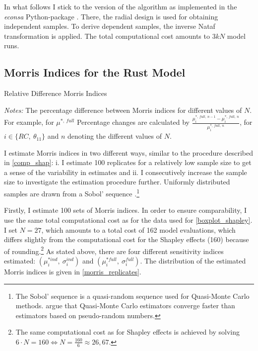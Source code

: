In what follows I stick to the version of the algorithm as implemented in the \textit{econsa} Python-package \citep{OSE21}. There, the radial design is used for obtaining independent samples. To derive dependent samples, the inverse Nataf transformation is applied. The total computational cost amounts to $3kN$ model runs.

\subsection{Morris Indices for the Rust Model} \label{morris_rust_model}

\begin{table}[t]
    \caption{Relative Difference Morris Indices}
    \label{rel_diff_morris}
    \centering

    \begin{threeparttable}
        \begin{centering}
            
            \begin{tablenotes}
                \small
                \item \textit{Notes:} The percentage difference between Morris indices for different values of $N$. For example, for $\mu^{\ast,\ full}$ Percentage changes are calculated by $\frac{\mu^{\ast,\ full,\ n-1}_i - \mu^{\ast,\ full,\ n}_i}{\mu^{\ast,\ full,\ n}_i}$, for $i \in \{RC,\ \theta_{11}\}$ and $n$ denoting the different values of $N$.
            \end{tablenotes}
        \end{centering}

        \end{threeparttable}
\end{table}

I estimate Morris indices in two different ways, similar to the procedure described in \cref{comp_shap}: i. I estimate 100 replicates for a relatively low sample size to get a sense of the variability in estimates and ii. I consecutively increase the sample size to investigate
the estimation procedure further. Uniformly distributed samples are drawn from a Sobol'
sequence \citep{S76}.\footnote{The Sobol' sequence is a quasi-random sequence used for Quasi-Monte Carlo methods. \citet{KTA12} argue that Quasi-Monte Carlo estimators converge faster than estimators based on pseudo-random numbers.}

Firstly, I estimate 100 sets of Morris indices. In order to ensure comparability, I use the same total computational cost as for the data used for \cref{boxplot_shapley}. I set $N = 27$, which amounts
to a total cost of 162 model evaluations, which differs slightly from the computational
cost for the Shapley effects (160) because of rounding.\footnote{The same computational cost as for Shapley effects is achieved by solving $6 \cdot N = 160 \Leftrightarrow N = \frac{160}{6} \approx 26,67$.} As stated above, there are four different
sensitivity indices estimated: $(\mu^{\ast ind}_i,\ \sigma_i^{ind})$ and $(\mu^{\ast full}_i,\ \sigma_i^{full})$. The distribution of the
estimated Morris indices is given in \cref{morris_replicates}.

